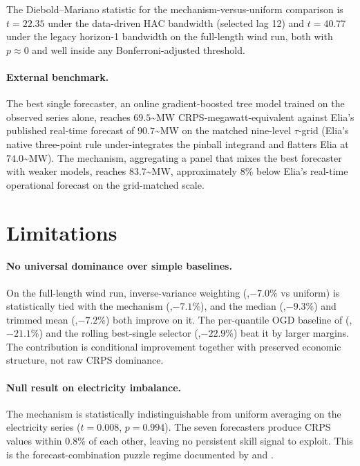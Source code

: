\documentclass[
  11pt,
  a4paper,
  oneside]{report}
\begin{document}
The Diebold--Mariano statistic for the mechanism-versus-uniform
comparison is \(t = 22.35\) under the \citet{andrews1991hac} data-driven HAC
bandwidth (selected lag 12) and \(t = 40.77\) under the legacy
horizon-1 bandwidth on the full-length wind run, both with \(p \approx 0\)
and well inside any Bonferroni-adjusted threshold.

\paragraph{External benchmark.}

The best single forecaster, an online gradient-boosted tree model
trained on the observed series alone, reaches \(69.5\)\textasciitilde MW
CRPS-megawatt-equivalent against Elia's published real-time forecast of
\(90.7\)\textasciitilde MW on the matched nine-level \(\tau\)-grid
(Elia's native three-point rule under-integrates the pinball integrand
and flatters Elia at \(74.0\)\textasciitilde MW). The mechanism,
aggregating a panel that mixes the best forecaster with weaker models,
reaches \(83.7\)\textasciitilde MW, approximately \(8\%\) below Elia's
real-time operational forecast on the grid-matched scale.

\section{Limitations}\label{limitations}

\paragraph{No universal dominance over simple baselines.}

On the full-length wind run, inverse-variance weighting (,\(-7.0\%\) vs
uniform) is statistically tied with the mechanism (,\(-7.1\%\)), and the
median (,\(-9.3\%\)) and trimmed mean (,\(-7.2\%\)) both improve on it.
The per-quantile OGD baseline of \citet{vitali2025intermittent}
(,\(-21.1\%\)) and the rolling best-single selector (,\(-22.9\%\)) beat
it by larger margins. The contribution is conditional improvement
together with preserved economic structure, not raw CRPS dominance.

\paragraph{Null result on electricity imbalance.}

The mechanism is statistically indistinguishable from uniform averaging
on the electricity series (\(t = 0.008\), \(p = 0.994\)). The seven
forecasters produce CRPS values within \(0.8\%\) of each other, leaving
no persistent skill signal to exploit. This is the forecast-combination
puzzle regime documented by \citet{bates1969combination} and
\citet{timmermann2006forecast}.
\end{document}
